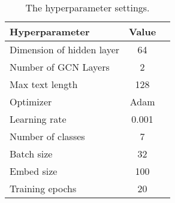 \begin{table}[htb]
    \caption{The hyperparameter settings.}\label{tbl:ch2-hpsetting}
    \centering
    \begin{tabular}{l c c}
        \toprule
        Hyperparameter            & Value \\
        \midrule
        Dimension of hidden layer & 64    \\
        Number of GCN Layers      & 2     \\
        Max text length           & 128   \\
        Optimizer                 & Adam  \\
        Learning rate             & 0.001 \\
        Number of classes         & 7     \\
        Batch size                & 32    \\
        Embed size                & 100   \\
        Training epochs           & 20    \\
        \midrule
        \bottomrule
    \end{tabular}
\end{table}





